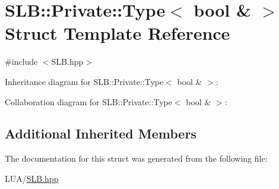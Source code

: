 \hypertarget{structSLB_1_1Private_1_1Type_3_01bool_01_6_01_4}{}\section{S\+LB\+:\+:Private\+:\+:Type$<$ bool \& $>$ Struct Template Reference}
\label{structSLB_1_1Private_1_1Type_3_01bool_01_6_01_4}


{\ttfamily \#include $<$S\+L\+B.\+hpp$>$}



Inheritance diagram for S\+LB\+:\+:Private\+:\+:Type$<$ bool \& $>$\+:


Collaboration diagram for S\+LB\+:\+:Private\+:\+:Type$<$ bool \& $>$\+:
\subsection*{Additional Inherited Members}


The documentation for this struct was generated from the following file\+:\begin{DoxyCompactItemize}
\item 
L\+U\+A/\hyperlink{SLB_8hpp}{S\+L\+B.\+hpp}\end{DoxyCompactItemize}
